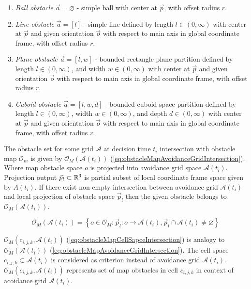 \begin{enumerate}
    \item\emph{Ball obstacle $\vec{a}=\varnothing$} - simple ball with center at $\vec{p}$, with offset radius $r$.
    \item\emph{Line obstacle $\vec{a}=[l]$} - simple line defined by length $l\in(0,\infty)$ with center at $\vec{p}$ and given orientation $\vec{o}$ with respect to main axis in global coordinate frame, with offset radius $r$.
    \item\emph{Plane obstacle $\vec{a}=[l,w]$} - bounded rectangle plane partition defined by length $l\in(0,\infty)$, and width $w\in(0,\infty)$ with center at $\vec{p}$ and given orientation $\vec{o}$ with respect to main axis in global coordinate frame, with offset radius $r$.
    \item\emph{Cuboid obstacle $\vec{a}=[l,w,d]$} - bounded cuboid space partition defined by length $l\in(0,\infty)$, width $w\in(0,\infty)$, and depth $d\in(0,\infty)$ with center at $\vec{p}$ and given orientation $\vec{o}$ with respect to main axis in global coordinate frame, with offset radius $r$.
\end{enumerate}
\noindent The obstacle set for some grid $\mathscr{A}$ at decision time $t_i$ intersection with obstacle map $\mathscr{O}_m$ is given by $\mathscr{O}_M(\mathscr{A}(t_i))$ (\ref{eq:obstacleMapAvoidanceGridIntersection}). Where map obstacle space $o$ is projected into avoidance grid space $\mathscr{A}(t_i)$. Projection output $\vec{p}_l\subset\mathbb{R}^3$ is partial subset of local coordinate frame space given by $A(t_i)$. If there exist non empty intersection between avoidance grid $\mathscr{A}(t_i)$ and local projection of obstacle space $\vec{p}_l$ then the given obstacle belongs to $\mathscr{O}_M(\mathscr{A}(t_i))$.

\begin{equation}\label{eq:obstacleMapAvoidanceGridIntersection}
    \mathscr{O}_M(\mathscr{A}(t_i))=\left\{o\in\mathscr{O}_M:\vec{p}_l:o \to\mathscr{A} (t_i), \vec{p}_l \cap \mathscr{A}(t_i)\neq\varnothing \right\}    
\end{equation}

\noindent $\mathscr{O}_M(c_{i,j,k},\mathscr{A}(t_i))$ (\ref{eq:obstacleMapCellSapceIntersection}) is analogy to $\mathscr{O}_M(\mathscr{A}(t_i))$ (\ref{eq:obstacleMapAvoidanceGridIntersection}). The cell space $c_{i,j,k}\subset\mathscr{A}(t_i)$ is considered as criterion instead of avoidance grid $\mathscr{A}(t_i)$. $\mathscr{O}_M(c_{i,j,k},\mathscr{A}(t_i))$ represents set of map obstacles in cell $c_{i,j,k}$ in context of acoidance grid $\mathscr{A}(t_i)$.

